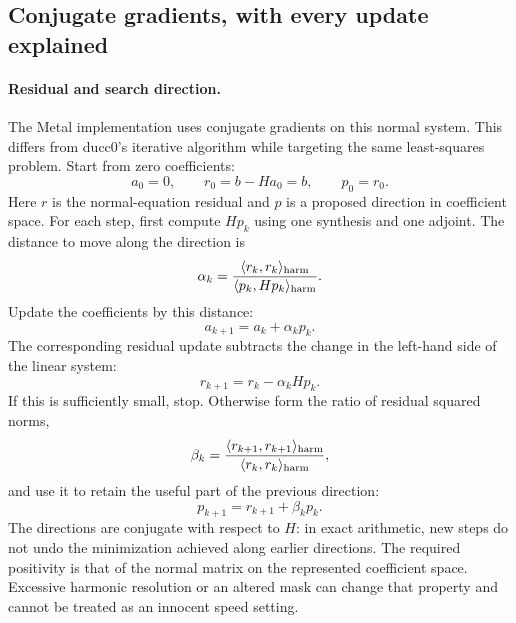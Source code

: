 \documentclass[11pt]{article}
\begin{document}
\subsection{Conjugate gradients, with every update explained}

\paragraph{Residual and search direction.}
The Metal implementation uses conjugate gradients on this normal system.
This differs from ducc0's iterative algorithm while targeting the same
least-squares problem. Start from zero coefficients:
\begin{equation}
 a_0=0,\qquad r_0=b-Ha_0=b,\qquad p_0=r_0.
\end{equation}
Here $r$ is the normal-equation residual and $p$ is a proposed direction
in coefficient space. For each step, first compute $Hp_k$ using one
synthesis and one adjoint. The distance to move along the direction is
\begin{equation}
 \alpha_k=\frac{\langle r_k,r_k\rangle_{\rm harm}}
 {\langle p_k,Hp_k\rangle_{\rm harm}}.
\end{equation}
Update the coefficients by this distance:
\begin{equation}
 a_{k+1}=a_k+\alpha_k p_k.
\end{equation}
The corresponding residual update subtracts the change in the left-hand
side of the linear system:
\begin{equation}
 r_{k+1}=r_k-\alpha_k Hp_k.
\end{equation}
If this is sufficiently small, stop. Otherwise form the ratio of residual
squared norms,
\begin{equation}
 \beta_k=\frac{\langle r_{k+1},r_{k+1}\rangle_{\rm harm}}
 {\langle r_k,r_k\rangle_{\rm harm}},
\end{equation}
and use it to retain the useful part of the previous direction:
\begin{equation}
 p_{k+1}=r_{k+1}+\beta_k p_k.
\end{equation}
The directions are conjugate with respect to $H$: in exact arithmetic,
new steps do not undo the minimization achieved along earlier directions.
The required positivity is that of the normal matrix on the represented
coefficient space. Excessive harmonic resolution or an altered mask can
change that property and cannot be treated as an innocent speed setting.
\end{document}
